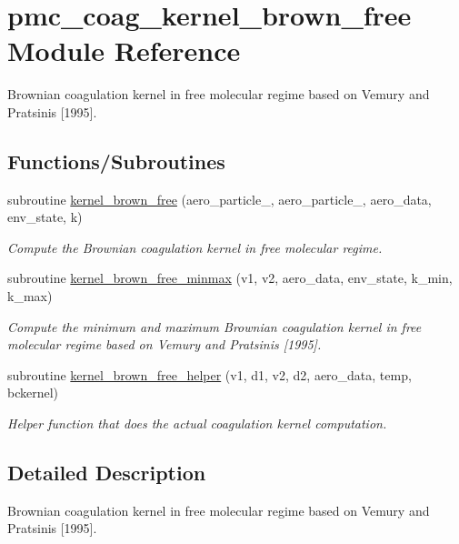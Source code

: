 \hypertarget{namespacepmc__coag__kernel__brown__free}{}\section{pmc\+\_\+coag\+\_\+kernel\+\_\+brown\+\_\+free Module Reference}
\label{namespacepmc__coag__kernel__brown__free}


Brownian coagulation kernel in free molecular regime based on Vemury and Pratsinis \mbox{[}1995\mbox{]}.  


\subsection*{Functions/\+Subroutines}
\begin{DoxyCompactItemize}
\item 
subroutine \mbox{\hyperlink{namespacepmc__coag__kernel__brown__free_acb35db238e663c0e830a6ce3effc98b6}{kernel\+\_\+brown\+\_\+free}} (aero\+\_\+particle\+\_, aero\+\_\+particle\+\_, aero\+\_\+data, env\+\_\+state, k)
\begin{DoxyCompactList}\small\item\em Compute the Brownian coagulation kernel in free molecular regime. \end{DoxyCompactList}\item 
subroutine \mbox{\hyperlink{namespacepmc__coag__kernel__brown__free_adb621b747cf27e71d37df880e3c82226}{kernel\+\_\+brown\+\_\+free\+\_\+minmax}} (v1, v2, aero\+\_\+data, env\+\_\+state, k\+\_\+min, k\+\_\+max)
\begin{DoxyCompactList}\small\item\em Compute the minimum and maximum Brownian coagulation kernel in free molecular regime based on Vemury and Pratsinis \mbox{[}1995\mbox{]}. \end{DoxyCompactList}\item 
subroutine \mbox{\hyperlink{namespacepmc__coag__kernel__brown__free_a3d26570456a6893dfc9661559d887375}{kernel\+\_\+brown\+\_\+free\+\_\+helper}} (v1, d1, v2, d2, aero\+\_\+data, temp, bckernel)
\begin{DoxyCompactList}\small\item\em Helper function that does the actual coagulation kernel computation. \end{DoxyCompactList}\end{DoxyCompactItemize}


\subsection{Detailed Description}
Brownian coagulation kernel in free molecular regime based on Vemury and Pratsinis \mbox{[}1995\mbox{]}. 

